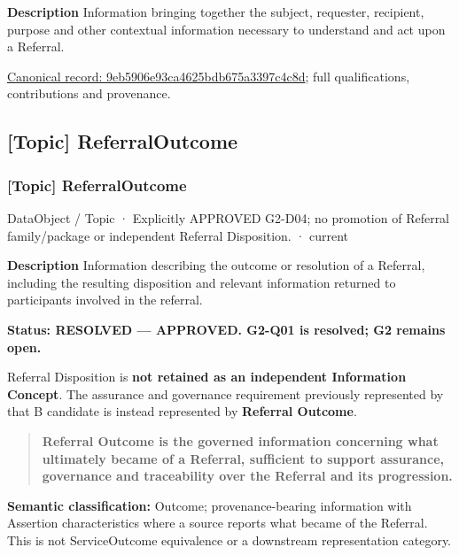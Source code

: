 \textbf{Description}
Information bringing together the subject, requester, recipient, purpose and other contextual information necessary to understand and act upon a Referral.


{\footnotesize \href{../../../../continuum/application/data-object/topic/9eb5906e93ca4625bdb675a3397c4c8d.md}{Canonical record: 9eb5906e93ca4625bdb675a3397c4c8d}; full qualifications, contributions and provenance.}\par
\subsection{[Topic] ReferralOutcome}

\subsubsection{[Topic] ReferralOutcome}

\label{element:18ad2e58913b4a938e172df7b03f366a}
{\small DataObject / Topic · Explicitly APPROVED G2-D04; no promotion of Referral family/package or independent Referral Disposition. · current}\par

\textbf{Description}
Information describing the outcome or resolution of a Referral, including the resulting disposition and relevant information returned to participants involved in the referral.



\textbf{Status: RESOLVED — APPROVED. G2-Q01 is resolved; G2 remains open.}



Referral Disposition is \textbf{not retained as an independent Information Concept}. The assurance and governance requirement previously represented by that B candidate is instead represented by \textbf{Referral Outcome}.



\begin{quote}


\textbf{Referral Outcome is the governed information concerning what ultimately became of a Referral, sufficient to support assurance, governance and traceability over the Referral and its progression.}



\end{quote}


\textbf{Semantic classification:} Outcome; provenance-bearing information with Assertion characteristics where a source reports what became of the Referral. This is not ServiceOutcome equivalence or a downstream representation category.



